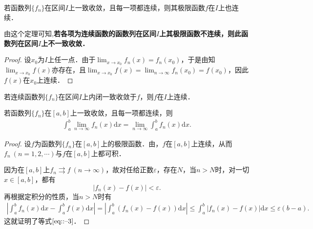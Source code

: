 \documentclass[../../main.tex]{subfiles}%
\begin{document}
\begin{theorem}[连续性]\label{theorem:定理13.98648}
若函数列\(\{f_n\}\)在区间\(I\)上一致收敛，且每一项都连续，则其极限函数\(f\)在\(I\)上也连续．
\end{theorem}
\begin{note}
由这个定理可知,\textbf{若各项为连续函数的函数列在区间\(I\)上其极限函数不连续，则此函数列在区间\(I\)上不一致收敛．}
\end{note}
\begin{proof}

设\(x_0\)为\(I\)上任一点．由于\(\lim_{x \to x_0} f_n(x) = f_n(x_0)\)，于是由知\(\lim_{x \to x_0} f(x)\)亦存在，且\(\lim_{x \to x_0} f(x) = \lim_{n \to \infty} f_n(x_0) = f(x_0)\)，因此\(f(x)\)在\(x_0\)上连续．

\end{proof}

\begin{corollary}
若连续函数列\(\{f_n\}\)在区间\(I\)上内闭一致收敛于\(f\)，则\(f\)在\(I\)上连续．
\end{corollary}

\begin{theorem}[可积性]\label{theorem:定理13.15648640}
若函数列\(\{f_n\}\)在\([a, b]\)上一致收敛，且每一项都连续，则
\begin{align}
\int_a^b \lim_{n \to \infty} f_n(x) \mathrm{d}x = \lim_{n \to \infty} \int_a^b f_n(x) \mathrm{d}x. \label{eq::--3}
\end{align}
\end{theorem}
\begin{proof}

设\(f\)为函数列\(\{f_n\}\)在\([a, b]\)上的极限函数．由，\(f\)在\([a, b]\)上连续，从而\(f_n \ (n = 1, 2, \cdots)\)与\(f\)在\([a, b]\)上都可积．

因为在\([a, b]\)上\(f_n \rightrightarrows f \ (n \to \infty)\)，故对任给正数\(\varepsilon\)，存在\(N\)，当\(n > N\)时，对一切\(x \in [a, b]\)，都有
\[
|f_n(x) - f(x)| < \varepsilon.
\]
再根据定积分的性质，当\(n > N\)时有
\begin{align*}
\left| \int_a^b f_n(x) \mathrm{d}x - \int_a^b f(x) \mathrm{d}x \right| = \left| \int_a^b (f_n(x) - f(x)) \mathrm{d}x \right| 
\leqslant \int_a^b |f_n(x) - f(x)| \mathrm{d}x 
\leqslant \varepsilon(b - a).
\end{align*}
这就证明了等式\(\eqref{eq::--3}\)．

\end{proof}
\end{document}
